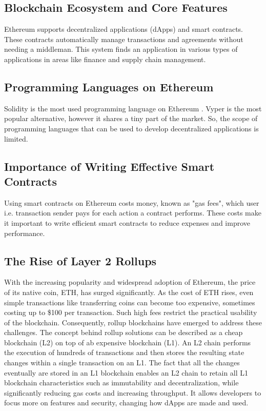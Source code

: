 \subsection{Blockchain Ecosystem and Core Features}
Ethereum supports decentralized applications (dApps) and smart contracts. These contracts automatically manage transactions and agreements without needing a middleman. This system finds an application in various types of applications in areas like finance and supply chain management.

\subsection{Programming Languages on Ethereum}

Solidity is the most used programming language on Ethereum \cite{SolidityWidelyUsed}. Vyper is the most popular alternative, however it shares a tiny part of the market. So, the scope of programming languages that can be used to develop decentralized applications is limited.

\subsection{Importance of Writing Effective Smart Contracts}
Using smart contracts on Ethereum costs money, known as "gas fees", which user i.e. transaction sender pays for each action a contract performs. These costs make it important to write efficient smart contracts to reduce expenses and improve performance.

\subsection{The Rise of Layer 2 Rollups}
With the increasing popularity and widespread adoption of Ethereum, the price of its native coin, ETH, has surged significantly. As the cost of ETH rises, even simple transactions like transferring coins can become too expensive, sometimes costing up to \$100 per transaction. Such high fees restrict the practical usability of the blockchain. Consequently, rollup blockchains have emerged to address these challenges. The concept behind rollup solutions can be described as a cheap blockchain (L2) on top of ab expensive blockchain (L1). An L2 chain performs the execution of hundreds of transactions and then stores the resulting state changes within a single transaction on an L1. The fact that all the changes eventually are stored in an L1 blockchain enables an L2 chain to retain all L1 blockchain characteristics such as immutability and decentralization, while significantly reducing gas costs and increasing throughput. It allows developers to focus more on features and security, changing how dApps are made and used.


